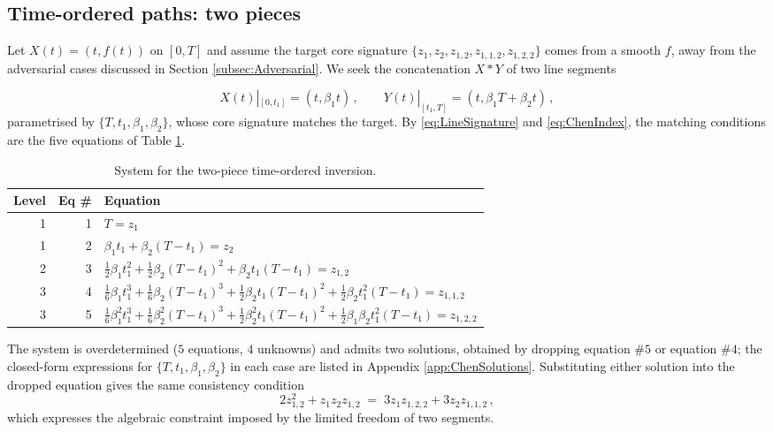 \documentclass[12pt,english]{article}
\providecommand{\tabularnewline}{\\}
\theoremstyle{remark}
\begin{document}
\subsection{Time-ordered paths: two pieces\label{subsec:Time-ordered-paths}}

\begin{sloppypar}
Let $X(t)=(t,f(t))$ on $[0,T]$ and assume the target core signature
$\{z_{1},z_{2},z_{1,2},z_{1,1,2},z_{1,2,2}\}$ comes from a smooth
$f$, away from the adversarial cases discussed in Section \ref{subsec:Adversarial}.
We seek the concatenation $X*Y$ of two line segments
\end{sloppypar}
\[
X(t)|_{[0,t_{1}]}=(t,\beta_{1}t)\,,\qquad Y(t)|_{[t_{1},T]}=(t,\beta_{1}T+\beta_{2}t)\,,
\]
parametrised by $\{T,t_{1},\beta_{1},\beta_{2}\}$, whose core signature
matches the target. By \eqref{eq:LineSignature} and \eqref{eq:ChenIndex},
the matching conditions are the five equations of Table \ref{tab:SystemChenTS2P}.

\begin{table}[H]
\centering
\begin{tabular}{|r|r|l|}
\hline
Level & Eq \# & Equation\tabularnewline\hline\hline
1 & 1 & $T=z_{1}$\tabularnewline\hline
1 & 2 & $\beta_{1}t_{1}+\beta_{2}(T-t_{1})=z_{2}$\tabularnewline\hline
2 & 3 & $\frac{1}{2}\beta_{1}t_{1}^{2}+\frac{1}{2}\beta_{2}(T-t_{1})^{2}+\beta_{2}t_{1}(T-t_{1})=z_{1,2}$\tabularnewline\hline
3 & 4 & $\frac{1}{6}\beta_{1}t_{1}^{3}+\frac{1}{6}\beta_{2}(T-t_{1})^{3}+\frac{1}{2}\beta_{2}t_{1}(T-t_{1})^{2}+\frac{1}{2}\beta_{2}t_{1}^{2}(T-t_{1})=z_{1,1,2}$\tabularnewline\hline
3 & 5 & $\frac{1}{6}\beta_{1}^{2}t_{1}^{3}+\frac{1}{6}\beta_{2}^{2}(T-t_{1})^{3}+\frac{1}{2}\beta_{2}^{2}t_{1}(T-t_{1})^{2}+\frac{1}{2}\beta_{1}\beta_{2}t_{1}^{2}(T-t_{1})=z_{1,2,2}$\tabularnewline\hline
\end{tabular}
\caption{System for the two-piece time-ordered inversion.\label{tab:SystemChenTS2P}}
\end{table}

The system is overdetermined ($5$ equations, $4$ unknowns) and admits
two solutions, obtained by dropping equation $\#5$ or equation $\#4$;
the closed-form expressions for $\{T,t_{1},\beta_{1},\beta_{2}\}$
in each case are listed in Appendix \ref{app:ChenSolutions}. Substituting
either solution into the dropped equation gives the same consistency
condition
\begin{equation}
2z_{1,2}^{2}+z_{1}z_{2}z_{1,2}\;=\;3z_{1}z_{1,2,2}+3z_{2}z_{1,1,2}\,,\label{eq:Consistency2P}
\end{equation}
which expresses the algebraic constraint imposed by the limited freedom
of two segments.
\end{document}
